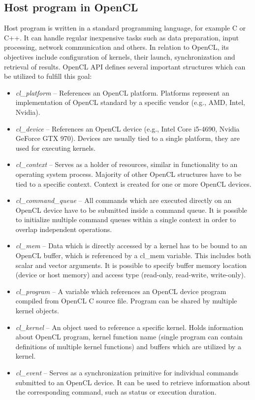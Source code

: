 \documentclass
[
    digital, %
    oneside, %
    table, %
    nolof, %
    nolot, %
    nocover %
]{fithesis3}
\begin{document}
\subsection{Host program in OpenCL}
Host program is written in a standard programming language, for example C or C++. It can handle regular inexpensive tasks such as data preparation,
input processing, network communication and others. In relation to OpenCL, its objectives include configuration of kernels, their launch,
synchronization and retrieval of results. OpenCL API defines several important structures which can be utilized to fulfill this goal:
\begin{itemize}
    \item \textit{cl\_platform} -- References an OpenCL platform. Platforms represent an implementation of OpenCL standard by a specific vendor
    (e.g., AMD, Intel, Nvidia). 
    \item \textit{cl\_device} -- References an OpenCL device (e.g., Intel Core i5-4690, Nvidia GeForce GTX 970). Devices are usually tied to a single
    platform, they are used for executing kernels.
    \item \textit{cl\_context} -- Serves as a holder of resources, similar in functionality to an operating system process. Majority of other OpenCL
    structures have to be tied to a specific context. Context is created for one or more OpenCL devices.
    \item \textit{cl\_command\_queue} -- All commands which are executed directly on an OpenCL device have to be submitted inside a command queue. It
    is possible to initialize multiple command queues within a single context in order to overlap independent operations.
    \item \textit{cl\_mem} -- Data which is directly accessed by a kernel has to be bound to an OpenCL buffer, which is referenced by a cl\_mem variable.
    This includes both scalar and vector arguments. It is possible to specify buffer memory location (device or host memory) and access type (read-only,
    read-write, write-only).
    \item \textit{cl\_program} -- A variable which references an OpenCL device program compiled from OpenCL C source file. Program can be shared by
    multiple kernel objects.
    \item \textit{cl\_kernel} -- An object used to reference a specific kernel. Holds information about OpenCL program, kernel function name (single
    program can contain definitions of multiple kernel functions) and buffers which are utilized by a kernel.
    \item \textit{cl\_event} -- Serves as a synchronization primitive for individual commands submitted to an OpenCL device. It can be used to retrieve
    information about the corresponding command, such as status or execution duration.
\end{itemize}
\end{document}
